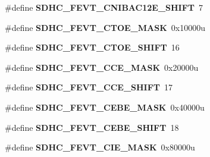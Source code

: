 \begin{DoxyCompactItemize}
\item 
\#define {\bfseries S\+D\+H\+C\+\_\+\+F\+E\+V\+T\+\_\+\+C\+N\+I\+B\+A\+C12\+E\+\_\+\+S\+H\+I\+FT}~7\hypertarget{group__SDHC__Register__Masks_ga957c710cf39c6135c058ed28b24a73e0}{}\label{group__SDHC__Register__Masks_ga957c710cf39c6135c058ed28b24a73e0}

\item 
\#define {\bfseries S\+D\+H\+C\+\_\+\+F\+E\+V\+T\+\_\+\+C\+T\+O\+E\+\_\+\+M\+A\+SK}~0x10000u\hypertarget{group__SDHC__Register__Masks_ga5ecd45d4cd669e887f5cef39e6a8f508}{}\label{group__SDHC__Register__Masks_ga5ecd45d4cd669e887f5cef39e6a8f508}

\item 
\#define {\bfseries S\+D\+H\+C\+\_\+\+F\+E\+V\+T\+\_\+\+C\+T\+O\+E\+\_\+\+S\+H\+I\+FT}~16\hypertarget{group__SDHC__Register__Masks_ga3e2cf2283cca7b5b5e6c61c92df6bcd6}{}\label{group__SDHC__Register__Masks_ga3e2cf2283cca7b5b5e6c61c92df6bcd6}

\item 
\#define {\bfseries S\+D\+H\+C\+\_\+\+F\+E\+V\+T\+\_\+\+C\+C\+E\+\_\+\+M\+A\+SK}~0x20000u\hypertarget{group__SDHC__Register__Masks_ga78a1d9a0fbc16e86deafa9caad24f19c}{}\label{group__SDHC__Register__Masks_ga78a1d9a0fbc16e86deafa9caad24f19c}

\item 
\#define {\bfseries S\+D\+H\+C\+\_\+\+F\+E\+V\+T\+\_\+\+C\+C\+E\+\_\+\+S\+H\+I\+FT}~17\hypertarget{group__SDHC__Register__Masks_ga9776fd49381a062a66adc38bec98d758}{}\label{group__SDHC__Register__Masks_ga9776fd49381a062a66adc38bec98d758}

\item 
\#define {\bfseries S\+D\+H\+C\+\_\+\+F\+E\+V\+T\+\_\+\+C\+E\+B\+E\+\_\+\+M\+A\+SK}~0x40000u\hypertarget{group__SDHC__Register__Masks_ga0d8b77f77f69ea2af8a8a6fe5162c0af}{}\label{group__SDHC__Register__Masks_ga0d8b77f77f69ea2af8a8a6fe5162c0af}

\item 
\#define {\bfseries S\+D\+H\+C\+\_\+\+F\+E\+V\+T\+\_\+\+C\+E\+B\+E\+\_\+\+S\+H\+I\+FT}~18\hypertarget{group__SDHC__Register__Masks_gaf981263c00f8808cfcde0ff564529bcc}{}\label{group__SDHC__Register__Masks_gaf981263c00f8808cfcde0ff564529bcc}

\item 
\#define {\bfseries S\+D\+H\+C\+\_\+\+F\+E\+V\+T\+\_\+\+C\+I\+E\+\_\+\+M\+A\+SK}~0x80000u\hypertarget{group__SDHC__Register__Masks_ga3c29789497e34050f12d49b5f8424531}{}\label{group__SDHC__Register__Masks_ga3c29789497e34050f12d49b5f8424531}


\end{DoxyCompactItemize}

